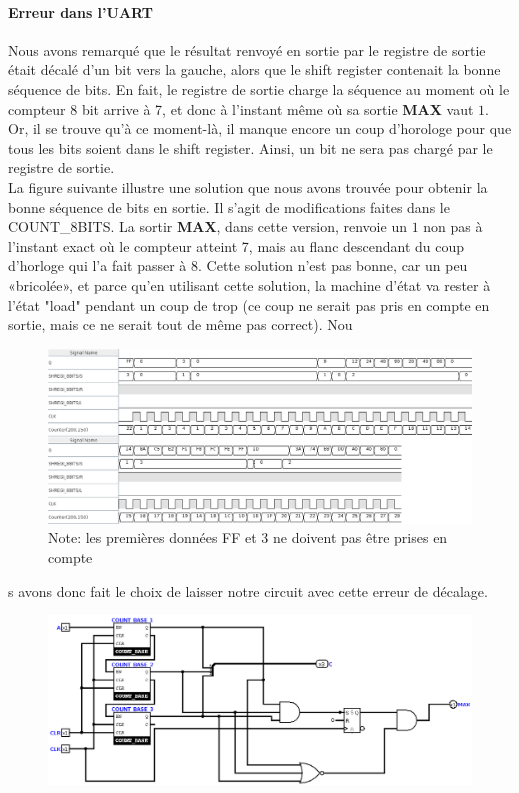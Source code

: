\documentclass[a4paper]{article} %
\begin{document}
\paragraph{Erreur dans l'UART}
Nous avons remarqué que le résultat renvoyé en sortie par le registre de sortie était décalé d'un bit vers la gauche, alors que le shift register contenait la bonne séquence de bits. En fait, le registre de sortie charge la séquence au moment où le compteur 8 bit arrive à 7, et donc à l'instant même où sa sortie \textbf{MAX} vaut $1$. Or, il se trouve qu'à ce moment-là, il manque encore un coup d'horologe pour que tous les bits soient dans le shift register. Ainsi, un bit ne sera pas chargé par le registre de sortie.\\
La figure suivante illustre une solution que nous avons trouvée pour obtenir la bonne séquence de bits en sortie. Il s'agit de modifications faites dans le COUNT\_8BITS. La sortir \textbf{MAX}, dans cette version, renvoie un $1$ non pas à l'instant exact où le compteur atteint 7, mais au flanc descendant du coup d'horloge qui l'a fait passer à 8. Cette solution n'est pas bonne, car un peu «bricolée», et parce qu'en utilisant cette solution, la machine d'état va rester à l'état "load" pendant un coup de trop (ce coup ne serait pas pris en compte en sortie, mais ce ne serait tout de même pas correct). Nou\begin{figure}[H]
\centering
    \includegraphics[width=1\textwidth]{src/chrono_SHREG_8BITS.png}
    \label{fig:chrono_shregi8}
    Note: les premières données FF et 3 ne doivent pas être prises en compte
\end{figure}s avons donc fait le choix de laisser notre circuit avec cette erreur de décalage.\\
\begin{figure}[H]
\centering
    \includegraphics[width=1\textwidth]{src/COUNT_8BITS_corrige.png}
    \label{fig:count8_corr}
\end{figure}
\end{document}

